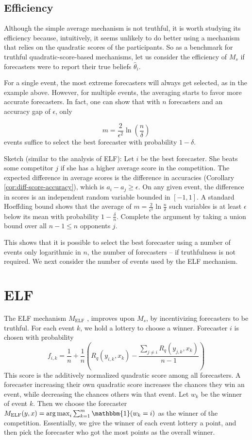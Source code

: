 \documentclass[letterpaper,12pt]{article}
\DeclareMathOperator*{\argmax}{arg\,max}
\newcommand{\1}{\mathbbm{1}}
\newcommand{\elf}{M_{\mathrm{ELF}}}
\begin{document}
\subsection{Efficiency}
Although the simple average mechanism is not truthful, it is worth studying its efficiency because, intuitively, it seems unlikely to do better using a mechanism that relies on the quadratic scores of the participants.
So as a benchmark for truthful quadratic-score-based mechanisms, let us consider the efficiency of $M_s$ if forecasters were to report their true beliefs $\hat \theta_i$.

For a single event, the most extreme forecasters will always get selected, as in the example above.
However, for multiple events, the averaging starts to favor more accurate forecasters.
In fact, one can show that with $n$ forecasters and an accuracy gap of $\epsilon$, only

  \[ m = \frac{2}{\epsilon^2}\ln\left(\frac{n}{\delta}\right) \]
events suffice to select the best forecaster with probability $1-\delta$.

Sketch (similar to the \citet{witkowski2018incentive} analysis of ELF): Let $i$ be the best forecaster.
She beats some competitor $j$ if she has a higher average score in the competition.
The expected difference in average scores is the difference in accuracies (Corollary \ref{cor:diff-score-accuracy}), which is $a_i - a_j \geq \epsilon$.
On any given event, the difference in scores is an independent random variable bounded in $[-1,1]$.
A standard Hoeffding bound \cite{Bo:todo-cite-or-reference}  shows that the average of $m = \frac{2}{\epsilon^2}\ln\tfrac{n}{\delta}$ such variables is at least $\epsilon$ below its mean with probability $1 - \tfrac{\delta}{n}$.
Complete the argument by taking a union bound over all $n-1 \leq n$ opponents $j$.

This shows that it is possible to select the best forecaster using a number of events only logarithmic in $n$, the number of forecasters -- if truthfulness is not required.
We next consider the number of events used by the ELF mechanism.

\section{ELF}
The ELF mechanism $\elf$ \citep{witkowski2018incentive}, improves upon $M_s$, by incentivizing forecasters to be truthful. For each event $k$, we hold a lottery to choose a winner. Forecaster $i$ is chosen with probability
\[ f_{i, k} = \frac{1}{n} + \frac{1}{n} \left(R_q(y_{i, k}, x_k) - \frac{\sum_{j\neq i} R_q(y_{j, k}, x_k)}{n-1} \right)\]
This score is the additively normalized quadratic score among all forecasters. A forecaster increasing their own quadratic score increases the chances they win an event, while decreasing the chances others win that event. Let $w_k$ be the winner of event $k$. Then we choose the forecaster $\elf(y, x) = \argmax_i \sum_{k=1}^m \1(w_k = i)$ as the winner of the competition. Essentially, we give the winner of each event lottery a point, and then pick the forecaster who got the most points as the overall winner.
\end{document}
